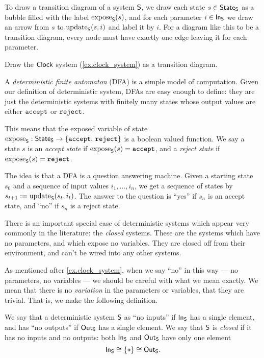 \documentclass[DynamicalBook]{subfiles}
\begin{document}
\begin{example}
To draw a transition diagram of a system $\mathsf{S}$, we draw each state $s \in
\mathsf{State}_{\mathsf{S}}$ as a bubble filled with the label $\mathrm{expose}_{\mathsf{S}}(s)$, and for each
parameter $i \in \mathsf{In}_{\mathsf{S}}$ we draw an arrow from $s$ to $\mathrm{update}_{\mathsf{S}}(s, i)$ and label it by $i$. For a
diagram like this to be a transition diagram, every node must have exactly one edge
leaving it for each parameter.
\end{example}

\begin{exercise}
  Draw the $\mathsf{Clock}$ system (\cref{ex.clock_system}) as a transition diagram.
\end{exercise}

\begin{example}\label{ex.dfa}
  A \emph{deterministic finite automaton} (DFA) is a simple model of computation.
  Given our definition of deterministic system, DFAs are easy enough to define:
  they are just the deterministic systems with finitely many states whose output values are either
  $\mathtt{accept}$ or $\mathtt{reject}$.

  This means that the exposed variable of state $\mathrm{expose}_{\mathsf{S}} : \mathsf{State}_{\mathsf{S}} \to
  \{\mathtt{accept},\, \mathtt{reject}\}$ is a boolean valued function. We say a
  state $s$ is an \emph{accept state} if $\mathrm{expose}_{\mathsf{S}}(s) = \mathtt{accept}$, and a
  \emph{reject state} if $\mathrm{expose}_{\mathsf{S}}(s) = \mathtt{reject}$.

  The idea is that a DFA is a question answering machine. Given a starting state
  $s_0$ and a sequence of input values $i_1, \ldots, i_n$, we get a sequence of
  states by $s_{t+1}:= \mathrm{update}_{\mathsf{S}}(s_t, i_t)$. The answer to the question is
  ``yes'' if $s_n$ is an accept state, and ``no'' if $s_n$ is a reject state.
\end{example}

There is an important special case of deterministic systems which appear very
commonly in the literature: the \emph{closed} systems. These are the systems
which have no parameters, and which expose no variables. They are closed off
from their environment, and can't be wired into any other systems.

As mentioned after \cref{ex.clock_system}, when we say ``no'' in this way --- no parameters, no variables --- we should be
careful with what we mean exactly. We mean that there is no \emph{variation} in
the parameters or variables, that they are trivial. That is, we make the
following definition.
\begin{definition}
  We say that a deterministic system $\mathsf{S}$ as ``no inputs'' if $\mathsf{In}_{\mathsf{S}}$ has a single element, and has ``no outputs'' if $\mathsf{Out}_{\mathsf{S}}$ has a single element. We say that $\mathsf{S}$ is \emph{closed} if it has no inputs and no outputs: both $\mathsf{In}_{\mathsf{S}}$ and
  $\mathsf{Out}_{\mathsf{S}}$ have only one element
  \[\mathsf{In}_{\mathsf{S}}\cong\{*\}\cong\mathsf{Out}_{\mathsf{S}}.\]
\end{definition}
\end{document}
